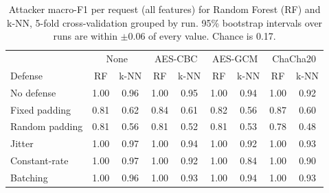 \begin{table}[t]
\centering
\caption{Attacker macro-F1 per request (all features) for Random Forest (RF) and k-NN, 5-fold cross-validation grouped by run. 95\% bootstrap intervals over runs are within $\pm$0.06 of every value. Chance is 0.17.}
\label{tab:results}
\begin{tabular}{lcccccccc}
\toprule
 & \multicolumn{2}{c}{None} & \multicolumn{2}{c}{AES-CBC} & \multicolumn{2}{c}{AES-GCM} & \multicolumn{2}{c}{ChaCha20} \\
Defense & RF & k-NN & RF & k-NN & RF & k-NN & RF & k-NN \\
\midrule
No defense & 1.00 & 0.96 & 1.00 & 0.95 & 1.00 & 0.94 & 1.00 & 0.92 \\
Fixed padding & 0.81 & 0.62 & 0.84 & 0.61 & 0.82 & 0.56 & 0.87 & 0.60 \\
Random padding & 0.81 & 0.56 & 0.81 & 0.52 & 0.81 & 0.53 & 0.78 & 0.48 \\
Jitter & 1.00 & 0.97 & 1.00 & 0.94 & 1.00 & 0.92 & 1.00 & 0.93 \\
Constant-rate & 1.00 & 0.97 & 1.00 & 0.92 & 1.00 & 0.84 & 1.00 & 0.90 \\
Batching & 1.00 & 0.96 & 1.00 & 0.93 & 1.00 & 0.94 & 1.00 & 0.93 \\
\bottomrule
\end{tabular}
\end{table}
